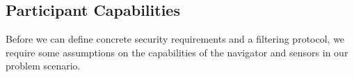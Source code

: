 \documentclass[twocolumn]{autart}
\begin{document}
% 
% 

\subsection{Participant Capabilities} 
Before we can define concrete security requirements and a filtering protocol, we require some assumptions on the capabilities of the navigator and sensors in our problem scenario.
\end{document}
